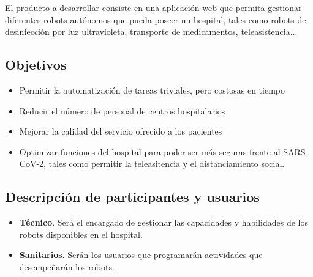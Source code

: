 El producto a desarrollar consiste en una aplicación web que permita gestionar diferentes robots autónomos
que pueda poseer un hospital, tales como robots de desinfección por luz ultravioleta, transporte de medicamentos, teleasistencia...

\subsection{Objetivos}
\begin{itemize}
\item Permitir la automatización de tareas triviales, pero costosas en tiempo
\item Reducir el número de personal de centros hospitalarios
\item Mejorar la calidad del servicio ofrecido a los pacientes
\item Optimizar funciones del hospital para poder ser más seguras frente al SARS-CoV-2, tales como permitir la teleasitencia y el distanciamiento social.
\end{itemize}

\subsection{Descripción de participantes y usuarios}

\begin{itemize}
\item \textbf{Técnico}. Será el encargado de gestionar las capacidades y habilidades de los robots disponibles en el hospital.
\item \textbf{Sanitarios}. Serán los usuarios que programarán actividades que desempeñarán los robots.
\end{itemize}
